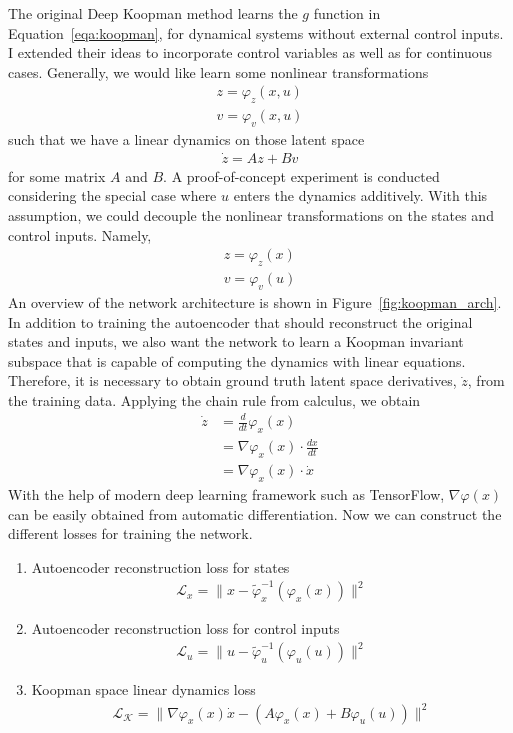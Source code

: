 \documentclass[10pt,twocolumn]{article}
\begin{document}
The original Deep Koopman method \cite{deepkoopman} learns the $g$ function in
Equation~\ref{eqa:koopman}, for dynamical systems without external control inputs.
I extended their ideas to incorporate control variables as well as for continuous cases.
Generally, we would like learn some nonlinear transformations
\begin{gather}
  z = \varphi_z(x, u) \\
  v = \varphi_v(x, u)
\end{gather}
such that we have a linear dynamics on those latent space
\begin{gather}
  \dot{z} = Az + Bv
\end{gather}
for some matrix $A$ and $B$. A proof-of-concept experiment is conducted considering
the special case where $u$ enters the dynamics additively.
With this assumption, we could decouple the nonlinear transformations on the states and
control inputs. Namely,
\begin{gather}
  z = \varphi_z(x) \\
  v = \varphi_v(u)
\end{gather}
An overview of the network architecture is shown in Figure~\ref{fig:koopman_arch}. In
addition to training the autoencoder that should reconstruct the original states and inputs,
we also want the network to learn a Koopman invariant subspace
that is capable of computing the dynamics with linear equations. Therefore, it is necessary
to obtain ground truth latent space derivatives, $\dot{z}$, from the training data.
Applying the chain rule from calculus, we obtain
\begin{equation}
  \begin{aligned}
    \dot{z} &= \frac{d}{dt} \varphi_x(x) \\
            &= \nabla \varphi_x(x) \cdot \frac{dx}{dt} \\
            &= \nabla \varphi_x(x) \cdot \dot{x}
  \end{aligned}
\end{equation}
With the help of modern deep learning framework such as TensorFlow, $\nabla \varphi(x)$ can
be easily obtained from automatic differentiation. Now we can construct the different losses
for training the network.
\begin{enumerate}
  \item Autoencoder reconstruction loss for states
    \begin{gather}
      \mathcal{L}_x = \| x - \tilde{\varphi}_x^{-1}(\varphi_x(x)) \|^2
    \end{gather}

  \item Autoencoder reconstruction loss for control inputs
    \begin{gather}
      \mathcal{L}_u = \| u - \tilde{\varphi}_u^{-1}(\varphi_u(u)) \|^2
    \end{gather}

  \item Koopman space linear dynamics loss
    \begin{gather}
      \mathcal{L}_{\mathcal{K}} = \| \nabla \varphi_x(x) \dot{x} -
                                     (A\varphi_x(x) + B\varphi_u(u) ) \|^2
    \end{gather}
\end{enumerate}
\end{document}
